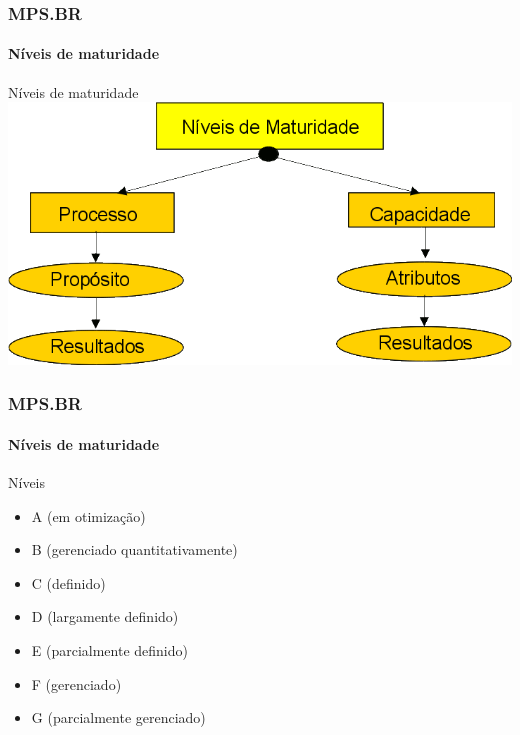 \begin{frame}
	\frametitle{MPS.BR}
	\framesubtitle{Níveis de maturidade}
	
	\begin{block:fact}{Níveis de maturidade}
		\centering
		\includegraphics[width=\textwidth]{software-engineering/project-management/process/process-quality/mpsbr/maturity-level}
	\end{block:fact}
\end{frame}



\begin{frame}
	\frametitle{MPS.BR}
	\framesubtitle{Níveis de maturidade}
	
	\begin{block:fact}{Níveis}
		\begin{itemize}
			\item A (em otimização)
			\item B (gerenciado quantitativamente)
			\item C (definido)
			\item D (largamente definido)
			\item E (parcialmente definido)
			\item F (gerenciado)
			\item G (parcialmente gerenciado)
		\end{itemize}
	\end{block:fact}
\end{frame}


